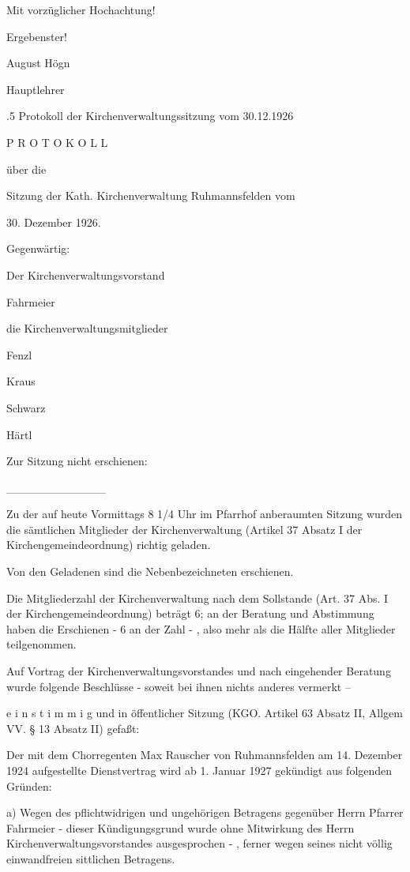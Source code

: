 \documentclass[12pt,a4paper]{book}
\begin{document}
    Mit vorzüglicher Hochachtung!

        Ergebenster!

            August Högn

                Hauptlehrer

.5 Protokoll der Kirchenverwaltungssitzung vom 30.12.1926

P R O T O K O L L

über die

Sitzung der Kath. Kirchenverwaltung Ruhmannsfelden vom

30. Dezember 1926.



Gegenwärtig:

Der Kirchenverwaltungsvorstand

Fahrmeier

die Kirchenverwaltungsmitglieder

Fenzl

Kraus

Schwarz

Härtl

Zur Sitzung nicht erschienen:

____________

Zu der auf heute Vormittags 8 1/4 Uhr im Pfarrhof anberaumten Sitzung wurden die
sämtlichen Mitglieder der Kirchenverwaltung (Artikel 37 Absatz I der
Kirchengemeindeordnung) richtig geladen.

Von den Geladenen sind die Nebenbezeichneten erschienen.

Die Mitgliederzahl der Kirchenverwaltung nach dem Sollstande (Art. 37 Abs. I der
Kirchengemeindeordnung) beträgt 6; an der Beratung und Abstimmung haben die
Erschienen - 6 an der Zahl - , also mehr als die Hälfte aller Mitglieder
teilgenommen.

Auf Vortrag der Kirchenverwaltungsvorstandes und nach eingehender Beratung wurde
folgende Beschlüsse - soweit bei ihnen nichts anderes vermerkt –

e i n s t i m m i g und in öffentlicher Sitzung (KGO. Artikel 63 Absatz II,
Allgem VV. § 13 Absatz II) gefaßt:



Der mit dem Chorregenten Max Rauscher von Ruhmannsfelden am 14. Dezember 1924
aufgestellte Dienstvertrag wird ab 1. Januar 1927 gekündigt aus folgenden
Gründen:

a) Wegen des pflichtwidrigen und ungehörigen Betragens gegenüber Herrn Pfarrer
Fahrmeier - dieser  Kündigungsgrund wurde ohne Mitwirkung des Herrn
Kirchenverwaltungsvorstandes ausgesprochen - , ferner wegen seines nicht völlig
einwandfreien sittlichen Betragens.
\end{document}

